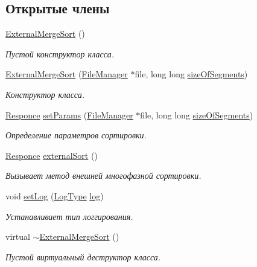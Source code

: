 \subsection*{Открытые члены}
\begin{DoxyCompactItemize}
\item 
\hyperlink{class_external_merge_sort_a7b6efcd2abbf59a8983f972c52d04650}{External\+Merge\+Sort} ()
\begin{DoxyCompactList}\small\item\em Пустой конструктор класса. \end{DoxyCompactList}\item 
\hyperlink{class_external_merge_sort_a37df182916b341d5466f2fff0d50dfed}{External\+Merge\+Sort} (\hyperlink{class_file_manager}{File\+Manager} $\ast$file, long long \hyperlink{class_external_merge_sort_a1d68bb5e0373cf16807a41272dff1a99}{size\+Of\+Segments})
\begin{DoxyCompactList}\small\item\em Конструктор класса. \end{DoxyCompactList}\item 
\hyperlink{_structures_8h_a9864d6ef28dd6e38416afac4426b3491}{Responce} \hyperlink{class_external_merge_sort_a2a27571acdf4f42e34798663e37f5e0b}{set\+Params} (\hyperlink{class_file_manager}{File\+Manager} $\ast$file, long long \hyperlink{class_external_merge_sort_a1d68bb5e0373cf16807a41272dff1a99}{size\+Of\+Segments})
\begin{DoxyCompactList}\small\item\em Определение параметров сортировки. \end{DoxyCompactList}\item 
\hyperlink{_structures_8h_a9864d6ef28dd6e38416afac4426b3491}{Responce} \hyperlink{class_external_merge_sort_aa0d80e41effe3a13c0d63b33e208918f}{external\+Sort} ()
\begin{DoxyCompactList}\small\item\em Вызывает метод внешней многофазной сортировки. \end{DoxyCompactList}\item 
void \hyperlink{class_external_merge_sort_ac0eeaba67ee0703acf73a8a5bf78ebe1}{set\+Log} (\hyperlink{_structures_8h_af67907baa897e9fb84df0cb89795b87c}{Log\+Type} \hyperlink{class_external_merge_sort_a41f61c3beb7dc529d7f2a8b2b4ee380b}{log})
\begin{DoxyCompactList}\small\item\em Устанавливает тип логгирования. \end{DoxyCompactList}\item 
virtual \hyperlink{class_external_merge_sort_adfee7073120e0ae832c96977440b2fb4}{$\sim$\+External\+Merge\+Sort} ()
\begin{DoxyCompactList}\small\item\em Пустой виртуальный деструктор класса. \end{DoxyCompactList}\end{DoxyCompactItemize}
